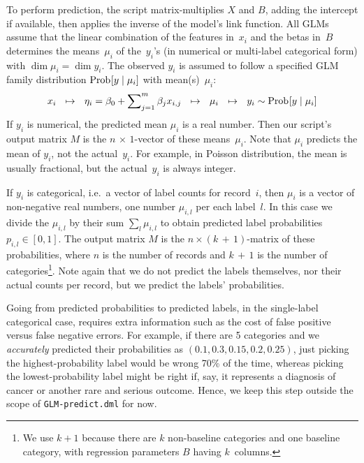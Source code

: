 To perform prediction, the script matrix-multiplies $X$ and $B$, adding the intercept
if available, then applies the inverse of the model's link function.  
All GLMs assume that the linear combination of the features in~$x_i$ and the betas
in~$B$ determines the means~$\mu_i$ of the~$y_i$'s (in numerical or multi-label
categorical form) with $\dim \mu_i = \dim y_i$.  The observed $y_i$ is assumed to follow
a specified GLM family distribution $\mathop{\mathrm{Prob}\hspace{0.5pt}}\nolimits[y\mid \mu_i]$ with mean(s)~$\mu_i$:
\begin{equation*}
x_i \,\,\,\,\mapsto\,\,\,\, \eta_i = \beta_0 + \sum\nolimits_{j=1}^m \beta_j x_{i,j} 
\,\,\,\,\mapsto\,\,\,\, \mu_i \,\,\,\,\mapsto \,\,\,\, y_i \sim \mathop{\mathrm{Prob}\hspace{0.5pt}}\nolimits[y\mid \mu_i]
\end{equation*}
If $y_i$ is numerical, the predicted mean $\mu_i$ is a real number.  Then our script's
output matrix $M$ is the $n\,{\times}\,1$-vector of these means~$\mu_i$.
Note that $\mu_i$ predicts the mean of $y_i$, not the actual~$y_i$.  For example,
in Poisson distribution, the mean is usually fractional, but the actual~$y_i$ is
always integer.

If $y_i$ is categorical, i.e.\ a vector of label counts for record~$i$, then $\mu_i$
is a vector of non-negative real numbers, one number $\mu_{i,l}$ per each label~$l$.
In this case we divide the $\mu_{i,l}$ by their sum $\sum_l \mu_{i,l}$ to obtain
predicted label probabilities~\mbox{$p_{i,l}\in [0, 1]$}.  The output matrix $M$ is
the $n \times (k\,{+}\,1)$-matrix of these probabilities, where $n$ is the number of
records and $k\,{+}\,1$ is the number of categories\footnote{We use $k+1$ because
there are $k$ non-baseline categories and one baseline category, with regression
parameters $B$ having $k$~columns.}.  Note again that we do not predict the labels
themselves, nor their actual counts per record, but we predict the labels' probabilities. 

Going from predicted probabilities to predicted labels, in the single-label categorical
case, requires extra information such as the cost of false positive versus
false negative errors.  For example, if there are 5 categories and we \emph{accurately}
predicted their probabilities as $(0.1, 0.3, 0.15, 0.2, 0.25)$, just picking the
highest-probability label would be wrong 70\% of the time, whereas picking the
lowest-probability label might be right if, say, it represents a diagnosis of cancer
or another rare and serious outcome.  Hence, we keep this step outside the scope of
{\tt GLM-predict.dml} for now.

